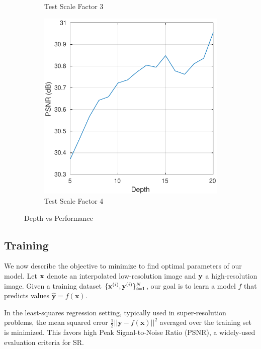 \documentclass[10pt,twocolumn,letterpaper]{article}
\begin{document}
\begin{figure}[t]
\begin{subfigure}{0.25\textwidth}
		\caption{Test Scale Factor 3}
		\label{fig:tiger}
	\end{subfigure}
	\quad
	\begin{subfigure}{0.25\textwidth}
		\includegraphics[width=\textwidth]{figs/depth_exp3}
		\caption{Test Scale Factor 4}
		\label{fig:mouse}
	\end{subfigure}
	\caption{Depth vs Performance}\label{fig:depth}
\end{figure}


\subsection{Training}

We now describe the objective to minimize to find optimal parameters of our model. Let ${\bf x}$ denote an interpolated low-resolution image and ${\bf y}$ a high-resolution image. 
Given a training dataset $\{{\bf x}^{(i)},{\bf y}^{(i)}\}{}_{i=1}^{N}$, our goal is to learn a model $f$ that predicts values $\mathbf{\hat{y}}=f(\mathbf{x})$.

In the least-squares regression setting, typically used in super-resolution
problems, the mean squared error $\frac{1}{2}||\mathbf{y}-f(\mathbf{x})||^{2}$
averaged over the training set is minimized. This favors high Peak Signal-to-Noise
Ratio (PSNR), a widely-used evaluation criteria for SR. 
\end{document}
